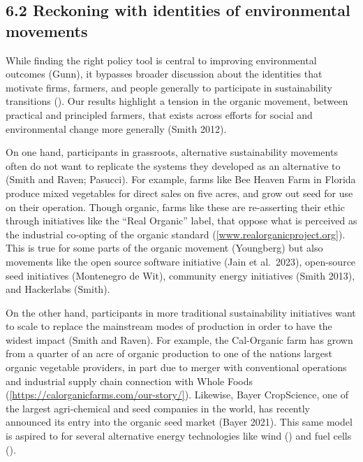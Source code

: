 \documentclass[twoside,12pt,final]{ucthesis-CA2012}
\begin{document}
\begin{ucmainmatter}
{\subsection{6.2 Reckoning with identities of environmental movements}\label{reckoning-with-identities-of-environmental-movements}}

While finding the right policy tool is central to improving
environmental outcomes (Gunn), it bypasses broader discussion about the
identities that motivate firms, farmers, and people generally to
participate in \textquotesingle sustainability transitions\textquotesingle{} (). Our results highlight
a tension in the organic movement, between practical and principled
farmers, that exists across efforts for social and environmental change
more generally (Smith 2012).

On one hand, participants in grassroots, alternative sustainability
movements often do not want to replicate the systems they developed as
an alternative to (Smith and Raven; Pasucci). For example, farms like
Bee Heaven Farm in Florida produce mixed vegetables for direct sales on
five acres, and grow out seed for use on their operation. Though
organic, farms like these are re-asserting their ethic through
initiatives like the ``Real Organic'' label, that oppose what is
perceived as the industrial co-opting of the organic standard
(\href{http://www.realorganicproject.org}{{[}www.realorganicproject.org{]}}).
This is true for some parts of the organic movement (Youngberg) but also
movements like the open source software initiative (Jain et al.~2023),
open-source seed initiatives (Montenegro de Wit), community energy
initiatives (Smith 2013), and Hackerlabs (Smith).

On the other hand, participants in more traditional sustainability
initiatives want to scale to replace the mainstream modes of production
in order to have the widest impact (Smith and Raven). For example, the
Cal-Organic farm has grown from a quarter of an acre of organic
production to one of the nation\textquotesingle s largest organic vegetable providers,
in part due to merger with conventional operations and industrial supply
chain connection with Whole Foods
(\href{https://calorganicfarms.com/our-story/}{{[}https://calorganicfarms.com/our-story/{]}}).
Likewise, Bayer CropScience, one of the largest agri-chemical and seed
companies in the world, has recently announced its entry into the
organic seed market (Bayer 2021). This same model is aspired to for
several alternative energy technologies like wind () and fuel cells ().


\end{ucmainmatter}
\end{document}
